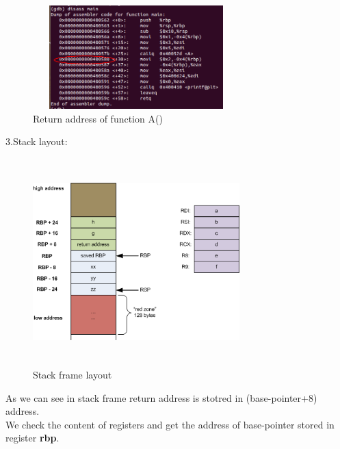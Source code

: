\documentclass{article}
\begin{document}
       
   
   \begin{figure}[htb]
     \begin{center}
		\includegraphics[width=8cm,height=4cm]{bo1.png}
	\caption{Return address of function A()}
	 \end{center}
	\end{figure}
        

    3.Stack layout:    
         \begin{figure}[H]
            \begin{center}
		\includegraphics[width=8cm,height=8cm]{stack.png}
	\caption{Stack frame layout}
	  \end{center}
	\end{figure}
        
        As we can see in stack frame return address is stotred in (base-pointer+8) address.\\
        We check the content of registers and get the address of base-pointer stored in register \textbf{rbp}.\\
         
\end{document}
